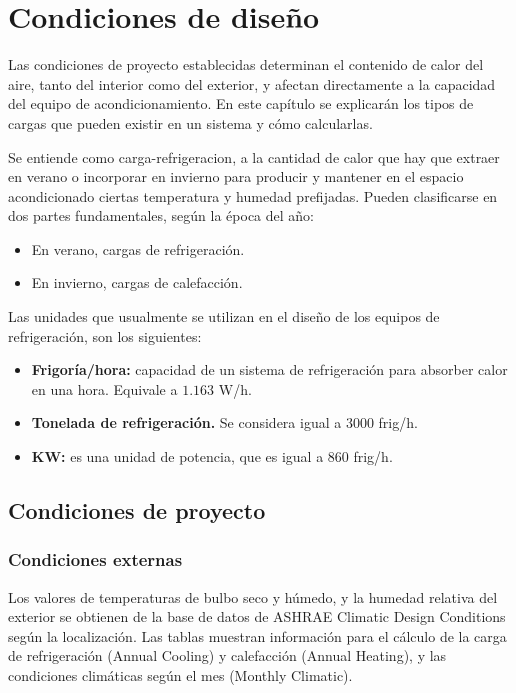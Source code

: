 \chapter{Condiciones de diseño}

\minitoc
Las condiciones de proyecto establecidas determinan el contenido de calor del aire, tanto del interior como del exterior, y afectan directamente a la capacidad del equipo de acondicionamiento. En este capítulo se explicarán los tipos de cargas que pueden existir en un sistema y cómo calcularlas.


Se entiende como \gls{carga-refrigeracion}, a la cantidad de calor que hay que extraer en verano o incorporar en invierno para producir y mantener en el espacio acondicionado ciertas temperatura y humedad prefijadas. Pueden clasificarse en dos partes fundamentales, según la época del año:
\begin{itemize}
	\item En verano, cargas de refrigeración.
	\item En invierno, cargas de calefacción.
\end{itemize}

Las unidades que usualmente se utilizan en el diseño de los equipos de refrigeración, son los siguientes:
\begin{itemize}
	\item \textbf{Frigoría/hora:} capacidad de un sistema de refrigeración para absorber calor en una hora. Equivale a $1.163$ W/h.
	\item \textbf{Tonelada de refrigeración.} Se considera igual a $3000$ frig/h.
	\item \textbf{KW:} es una unidad de potencia, que es igual a $860$ frig/h.  
\end{itemize}

\section{Condiciones de proyecto}


\subsection{Condiciones externas}

Los valores de temperaturas de bulbo seco y húmedo, y la humedad relativa del exterior se obtienen de la base de datos de ASHRAE Climatic Design Conditions \parencite{ashrae2025conditions} según la localización. Las tablas muestran información para el cálculo de la carga de refrigeración (Annual Cooling) y calefacción (Annual Heating), y las condiciones climáticas según el mes (Monthly Climatic).

